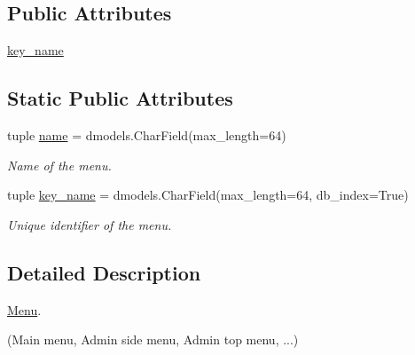 \subsection*{Public Attributes}
\begin{DoxyCompactItemize}
\item 
\hyperlink{classcore_1_1models_1_1Menu_a68d1ce76cccad9def97d24afe21ad728}{key\-\_\-name}
\end{DoxyCompactItemize}
\subsection*{Static Public Attributes}
\begin{DoxyCompactItemize}
\item 
tuple \hyperlink{classcore_1_1models_1_1Menu_a6782a44a3141438c0eca3fd2bcff4e9c}{name} = dmodels.\-Char\-Field(max\-\_\-length=64)
\begin{DoxyCompactList}\small\item\em Name of the menu. \end{DoxyCompactList}\item 
tuple \hyperlink{classcore_1_1models_1_1Menu_a68d1ce76cccad9def97d24afe21ad728}{key\-\_\-name} = dmodels.\-Char\-Field(max\-\_\-length=64, db\-\_\-index=True)
\begin{DoxyCompactList}\small\item\em Unique identifier of the menu. \end{DoxyCompactList}\end{DoxyCompactItemize}


\subsection{Detailed Description}
\hyperlink{classcore_1_1models_1_1Menu}{Menu}. 

(Main menu, Admin side menu, Admin top menu, ...) 


